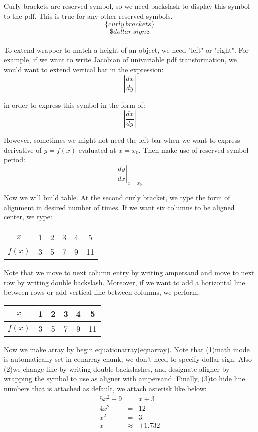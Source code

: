 \documentclass[11pt]{article}
\begin{document}
Curly brackets are reserved symbol, so we need backslash to display this symbol to
the pdf. This is true for any other reserved symbols.
$$\{curly\ brackets\}$$
$$\$dollar\ sign\$$$\\

To extend wrapper to match a height of an object, we need "left" or "right". For
example, if we want to write Jacobian of univariable pdf transformation, we would
want to extend vertical bar in the expression:
$$|\frac{dx}{dy}|$$

in order to express this symbol in the form of:
$$\left| \frac{dx}{dy} \right|$$

However, sometimes we might not need the left bar when we want to express derivative of $y=f(x)$ evaluated at $x=x_{0}$. Then make use of reserved symbol period:
$$\left. \frac{dy}{dx} \right|_{x=x_{0}}$$

Now we will build table. At the second curly bracket, we type the form of
alignment
in desired number of times. If we want six columns to be aligned center, we type:
\begin{tabular}{cccccc}
$x$ & 1 & 2 & 3 & 4 & 5 \\
$f(x)$ & 3 & 5 & 7 & 9 & 11
\end{tabular}

Note that we move to next column entry by writing ampersand and move to next row
by writing double backslash. Moreover, if we want to add a horizontal line between
rows or add vertical line between columns, we perform:
\begin{tabular}{|c|ccccc|}
\hline
$x$ & 1 & 2 & 3 & 4 & 5 \\ \hline
$f(x)$ & 3 & 5 & 7 & 9 & 11 \\ \hline
\end{tabular}

Now we make array by begin equationarray(eqnarray). Note that (1)math mode is
automatically set in eqnarray chunk; we don't need to specify dollar sign. Also
(2)we change line by writing double backslashes, and designate aligner by wrapping
the symbol to use as aligner with ampersand. Finally, (3)to hide line numbers that
is attached as default, we attach asterisk like below:
\begin{eqnarray*}
5x^2-9&=&x+3\\
4x^2&=&12\\
x^2&=&3\\
x&\approx&\pm1.732
\end{eqnarray*}
\end{document}
